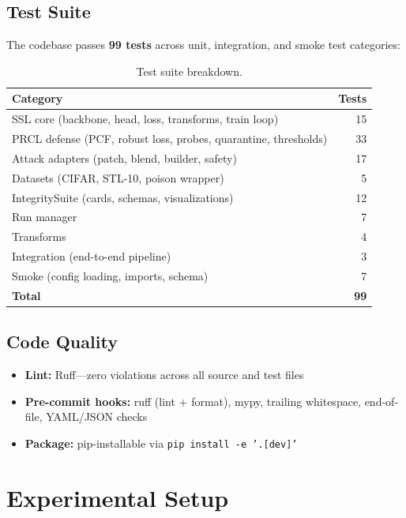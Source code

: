\documentclass[11pt,a4paper]{article}
\begin{document}
\subsection{Test Suite}

The codebase passes \textbf{99 tests} across unit, integration, and smoke test
categories:

\begin{table}[h]
\centering
\caption{Test suite breakdown.}
\begin{tabular}{@{}lr@{}}
\toprule
\textbf{Category} & \textbf{Tests} \\
\midrule
SSL core (backbone, head, loss, transforms, train loop) & 15 \\
PRCL defense (PCF, robust loss, probes, quarantine, thresholds) & 33 \\
Attack adapters (patch, blend, builder, safety) & 17 \\
Datasets (CIFAR, STL-10, poison wrapper) & 5 \\
IntegritySuite (cards, schemas, visualizations) & 12 \\
Run manager & 7 \\
Transforms & 4 \\
Integration (end-to-end pipeline) & 3 \\
Smoke (config loading, imports, schema) & 7 \\
\midrule
\textbf{Total} & \textbf{99} \\
\bottomrule
\end{tabular}
\end{table}

\subsection{Code Quality}

\begin{itemize}[nosep]
  \item \textbf{Lint:} Ruff---zero violations across all source and test files
  \item \textbf{Pre-commit hooks:} ruff (lint + format), mypy, trailing whitespace,
    end-of-file, YAML/JSON checks
  \item \textbf{Package:} pip-installable via \texttt{pip install -e '.[dev]'}
\end{itemize}


\section{Experimental Setup}
\label{sec:setup}
\end{document}
